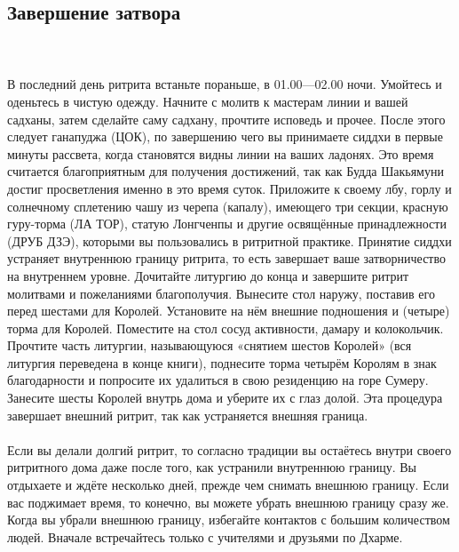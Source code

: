 \subsection{Завершение затвора}
\\ \\ В последний день ритрита встаньте пораньше, в 01.00—02.00 ночи. Умойтесь и оденьтесь в чистую одежду. Начните с молитв к мастерам линии и вашей садханы, затем сделайте саму садхану, прочтите исповедь и прочее. После этого следует ганапуджа (ЦОК), по завершению чего вы принимаете сиддхи в первые минуты рассвета, когда становятся видны линии на ваших ладонях. Это время считается благоприятным для получения достижений, так как Будда Шакьямуни достиг просветления именно в это время суток. Приложите к своему лбу, горлу и солнечному сплетению чашу из черепа (капалу), имеющего три секции, красную гуру-торма (ЛА ТОР), статую Лонгченпы и другие освящённые принадлежности (ДРУБ ДЗЭ), которыми вы пользовались в ритритной практике. Принятие сиддхи устраняет внутреннюю границу ритрита, то есть завершает ваше затворничество на внутреннем уровне. Дочитайте литургию до конца и завершите ритрит молитвами и пожеланиями благополучия. Вынесите стол наружу, поставив его перед шестами для Королей. Установите на нём внешние подношения и (четыре) торма для Королей. Поместите на стол сосуд активности, дамару и колокольчик. Прочтите часть литургии, называющуюся «снятием шестов Королей» (вся литургия переведена в конце книги), поднесите торма четырём Королям в знак благодарности и попросите их удалиться в свою резиденцию на горе Сумеру. Занесите шесты Королей внутрь дома и уберите их с глаз долой. Эта процедура завершает внешний ритрит, так как устраняется внешняя граница.
\\ \\ Если вы делали долгий ритрит, то согласно традиции вы остаётесь внутри своего ритритного дома даже после того, как устранили внутреннюю границу. Вы отдыхаете и ждёте несколько дней, прежде чем снимать внешнюю границу. Если вас поджимает время, то конечно, вы можете убрать внешнюю границу сразу же. Когда вы убрали внешнюю границу, избегайте контактов с большим количеством людей. Вначале встречайтесь только с учителями и друзьями по Дхарме.
